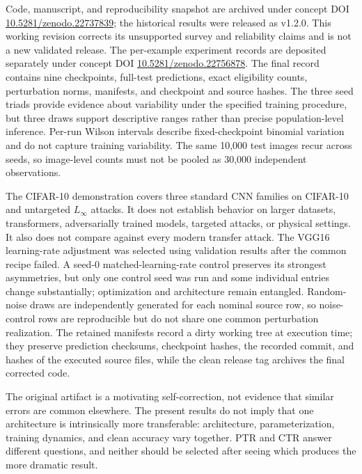 \documentclass[10pt,twocolumn]{article}
\begin{document}
Code, manuscript, and reproducibility snapshot are archived under concept DOI \href{https://doi.org/10.5281/zenodo.22737839}{10.5281/zenodo.22737839}; the historical results were released as v1.2.0. This working revision corrects its unsupported survey and reliability claims and is not a new validated release. The per-example experiment records are deposited separately under concept DOI \href{https://doi.org/10.5281/zenodo.22756878}{10.5281/zenodo.22756878}. The final record contains nine checkpoints, full-test predictions, exact eligibility counts, perturbation norms, manifests, and checkpoint and source hashes. The three seed triads provide evidence about variability under the specified training procedure, but three draws support descriptive ranges rather than precise population-level inference. Per-run Wilson intervals describe fixed-checkpoint binomial variation and do not capture training variability. The same 10,000 test images recur across seeds, so image-level counts must not be pooled as 30,000 independent observations.

The CIFAR-10 demonstration covers three standard CNN families on CIFAR-10 and untargeted $L_\infty$ attacks. It does not establish behavior on larger datasets, transformers, adversarially trained models, targeted attacks, or physical settings. It also does not compare against every modern transfer attack. The VGG16 learning-rate adjustment was selected using validation results after the common recipe failed. A seed-0 matched-learning-rate control preserves its strongest asymmetries, but only one control seed was run and some individual entries change substantially; optimization and architecture remain entangled. Random-noise draws are independently generated for each nominal source row, so noise-control rows are reproducible but do not share one common perturbation realization. The retained manifests record a dirty working tree at execution time; they preserve prediction checksums, checkpoint hashes, the recorded commit, and hashes of the executed source files, while the clean release tag archives the final corrected code.

The original artifact is a motivating self-correction, not evidence that similar errors are common elsewhere. The present results do not imply that one architecture is intrinsically more transferable: architecture, parameterization, training dynamics, and clean accuracy vary together. PTR and CTR answer different questions, and neither should be selected after seeing which produces the more dramatic result.
\end{document}
